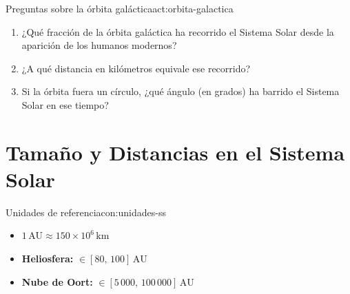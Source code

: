 \begin{actividad}{Preguntas sobre la órbita galáctica}{act:orbita-galactica}
    \begin{enumerate}[leftmargin=1.5em, label=\arabic*.]
        \item ¿Qué fracción de la órbita galáctica ha recorrido el Sistema Solar
              desde la aparición de los humanos modernos?
        \item ¿A qué distancia en kilómetros equivale ese recorrido?
        \item Si la órbita fuera un círculo, ¿qué ángulo (en grados) ha barrido
              el Sistema Solar en ese tiempo?
    \end{enumerate}
\end{actividad}

\section{Tamaño y Distancias en el Sistema Solar}

\begin{concepto}{Unidades de referencia}{con:unidades-ss}
    \begin{itemize}[leftmargin=1.5em]
        \item $1\,\text{AU} \approx 150 \times 10^{6}\,\text{km}$
        \item \textbf{Heliosfera:} $\in [80,\,100]\,\text{AU}$
        \item \textbf{Nube de Oort:} $\in [5\,000,\,100\,000]\,\text{AU}$
    \end{itemize}
\end{concepto}


